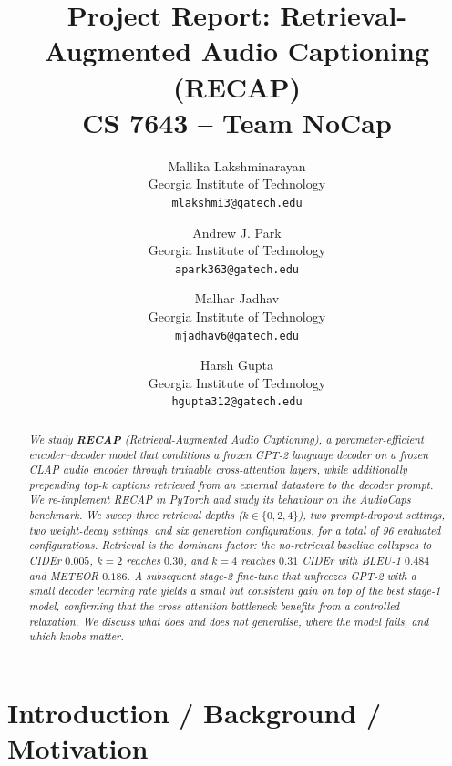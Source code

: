\documentclass[10pt,twocolumn,letterpaper]{article}
\begin{document}
\title{Project Report: Retrieval-Augmented Audio Captioning (RECAP)\\
\large CS 7643 -- Team NoCap}

\author{Mallika Lakshminarayan\\
Georgia Institute of Technology\\
{\tt\small mlakshmi3@gatech.edu}
\and
Andrew J. Park\\
Georgia Institute of Technology\\
{\tt\small apark363@gatech.edu}
\and
Malhar Jadhav\\
Georgia Institute of Technology\\
{\tt\small mjadhav6@gatech.edu}
\and
Harsh Gupta\\
Georgia Institute of Technology\\
{\tt\small hgupta312@gatech.edu}
}

\maketitle

\begin{abstract}
\textit{
We study \textbf{RECAP} (Retrieval-Augmented Audio Captioning), a parameter-efficient
encoder--decoder model that conditions a frozen GPT-2 language decoder on a
frozen CLAP audio encoder through trainable cross-attention layers, while
additionally prepending top-$k$ captions retrieved from an external datastore
to the decoder prompt. We re-implement RECAP in PyTorch and study its
behaviour on the AudioCaps benchmark. We sweep three retrieval depths
($k\in\{0,2,4\}$), two prompt-dropout settings, two weight-decay settings, and
six generation configurations, for a total of 96 evaluated configurations.
Retrieval is the dominant factor: the no-retrieval baseline collapses to
CIDEr $0.005$, $k{=}2$ reaches $0.30$, and $k{=}4$ reaches $0.31$ CIDEr with
BLEU-1 $0.484$ and METEOR $0.186$. A subsequent stage-2 fine-tune that unfreezes
GPT-2 with a small decoder learning rate yields a small but consistent gain on
top of the best stage-1 model, confirming that the cross-attention bottleneck
benefits from a controlled relaxation. We discuss what does and does not
generalise, where the model fails, and which knobs matter.
}
\end{abstract}

\section{Introduction / Background / Motivation}
\end{document}
